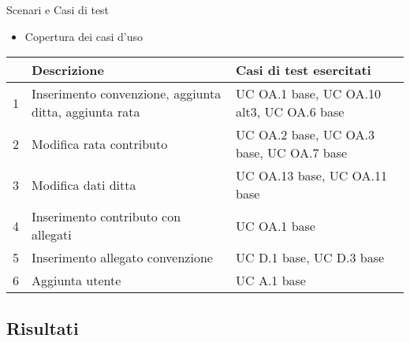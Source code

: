 \begin{frame}{Scenari e Casi di test}

\begin{itemize}
\item Copertura dei casi d'uso
\end{itemize}

\begin{center}
\footnotesize
\begin{tabular}{| c | p{4.5cm} | p{4cm} |} 
    \hline
     & Descrizione & Casi di test esercitati \\
    \hline
    1 & Inserimento convenzione,\newline
    aggiunta ditta,
    aggiunta rata & UC OA.1 base,
    UC OA.10 alt3,\newline
    UC OA.6 base\\
    \hline
    2 & Modifica rata contributo & UC OA.2 base,
    UC OA.3 base, \newline
    UC OA.7 base  \\
    \hline
    3 & Modifica dati ditta & UC OA.13 base,\newline
    UC OA.11 base \\
    \hline
    4 & Inserimento contributo con allegati & UC OA.1 base\\
    \hline
    5 & Inserimento allegato convenzione & UC D.1 base,
    UC D.3 base\\
    \hline
    6 & Aggiunta utente & UC A.1 base\\
    \hline
  \end{tabular} 
\end{center}

\end{frame}

\subsection{Risultati}

